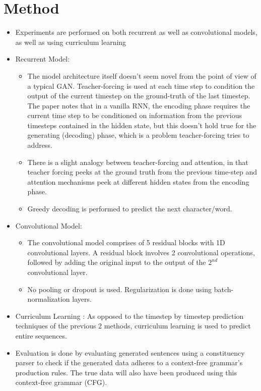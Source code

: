 \documentclass[12pt]{article}
\begin{document}
\section{Method}
  \begin{itemize}
    \item Experiments are performed on both recurrent as well as convolutional models, as well as using curriculum learning
    \item Recurrent Model:
      \begin{itemize}
        \item The model architecture itself doesn't seem novel from the point of view of a typical GAN. Teacher-forcing is used at each time step to condition the output of the current timestep on the ground-truth of the last timestep. The paper notes that in a vanilla RNN, the encoding phase requires the current time step to be conditioned on information from the previous timesteps contained in the hidden state, but this doesn't hold true for the generating (decoding) phase, which is a problem teacher-forcing tries to address.
        \item There is a slight analogy between teacher-forcing and attention, in that teacher forcing peeks at the ground truth from the previous time-step and attention mechanisms peek at different hidden states from the encoding phase.
        \item Greedy decoding is performed to predict the next character/word.
      \end{itemize}
    \item Convolutional Model:
      \begin{itemize}
        \item The convolutional model comprises of 5 residual blocks with 1D convolutional layers. A residual block involves 2 convolutional operations, followed by adding the original input to the output of the $2^{nd}$ convolutional layer.
        \item No pooling or dropout is used. Regularization is done using batch-normalization layers.
      \end{itemize}
    \item Curriculum Learning \cite{bengio2009curriculum}: As opposed to the timestep by timestep prediction techniques of the previous 2 methods, curriculum learning is used to predict entire sequences.
    \item Evaluation is done by evaluating generated sentences using a constituency parser to check if the generated data adheres to a context-free grammar's production rules. The true data will also have been produced using this context-free grammar (CFG).

\end{itemize}
\end{document}
